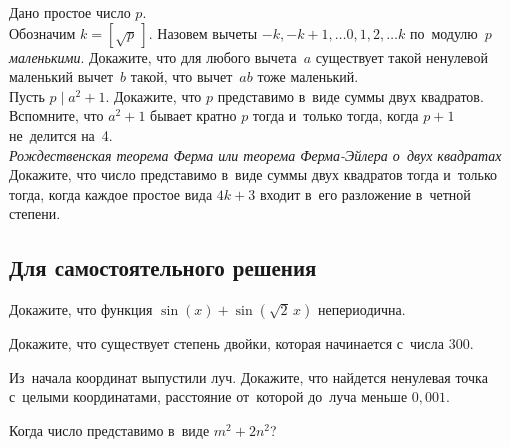 \begin{problems}

\item
Дано простое число $p$.
\\
\subproblem
Обозначим $k = [\sqrt{p}\,]$.
Назовем вычеты $-k, -k+1, \ldots 0, 1, 2, \ldots k$ по~модулю~$p$
\emph{маленькими}.
Докажите, что для любого вычета~$a$ существует такой ненулевой маленький
вычет~$b$ такой, что вычет~$a b$ тоже маленький.
\\
\subproblem
Пусть $p \mid a^2 + 1$.
Докажите, что $p$ представимо в~виде суммы двух квадратов.
\\
\subproblem
Вспомните, что $a^2 + 1$ бывает кратно $p$ тогда и~только тогда, когда $p + 1$
не~делится на~4.
\\
\subproblem
\emph{Рождественская теорема Ферма или теорема Ферма-Эйлера о~двух квадратах}
Докажите, что число представимо в~виде суммы двух квадратов тогда и~только
тогда, когда каждое простое вида $4 k + 3$ входит в~его разложение в~четной
степени.

\end{problems}

\subsection*{Для самостоятельного решения}

\begin{problems}

\item
Докажите, что функция $\sin(x) + \sin(\sqrt{2} \, x)$ непериодична.

\item
Докажите, что существует степень двойки, которая начинается с~числа $300$.

\item
Из~начала координат выпустили луч.
Докажите, что найдется ненулевая точка с~целыми координатами, расстояние
от~которой до~луча меньше $0{,}001$.

\item
Когда число представимо в~виде $m^2 + 2 n^2$?

\end{problems}

